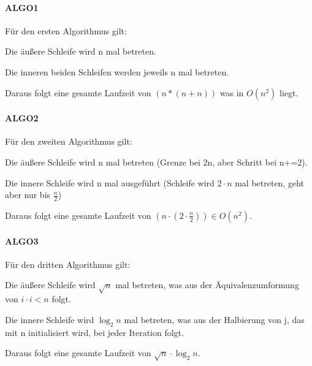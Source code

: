 \paragraph{ALGO1}
Für den ersten Algorithmus gilt:

Die äußere Schleife wird n mal betreten.

Die inneren beiden Schleifen werden jeweils n mal betreten.

Daraus folgt eine gesamte Laufzeit von $(n*(n+n))$ was in $O(n^2)$ liegt.


\paragraph{ALGO2}
Für den zweiten Algorithmus gilt:

Die äußere Schleife wird n mal betreten (Grenze bei 2n, aber Schritt bei n+=2).

Die innere Schleife wird n mal ausgeführt (Schleife wird $2 \cdot n$ mal betreten, geht aber nur bis $ \frac{n}{2} $)

Daraus folgt eine gesamte Laufzeit von $(n \cdot (2 \cdot \frac{n}{2}) ) \in O(n^2)$.


\paragraph{ALGO3}
Für den dritten Algorithmus gilt:

Die äußere Schleife wird $ \sqrt{n} $ mal betreten, was aus der Äquivalenzumformung von $i \cdot i < n $ folgt.

Die innere Schleife wird $ \log_{2}{n} $ mal betreten, was aus der Halbierung von j, das mit n initialisiert wird, bei jeder Iteration folgt.

Daraus folgt eine gesamte Laufzeit von $ \sqrt{n} \cdot \log_{2}{n} $.
